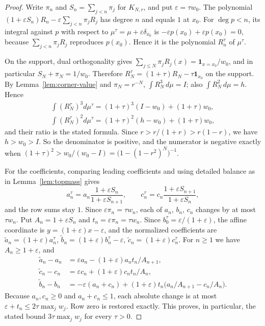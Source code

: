 \documentclass[twoside,10pt]{article}
\numberwithin{equation}{section}
\theoremstyle{slbody}
\theoremstyle{definition}
\theoremstyle{remark}
\begin{document}
\begin{proof}
Write $\pi_n$ and $S_n=\sum_{j<n}\pi_j$ for $K_{N,r}$, and put $\varepsilon=\tau w_0$. The polynomial $(1+\varepsilon S_n)R_n-\varepsilon\sum_{j<n}\pi_jR_j$ has degree $n$ and equals $1$ at $x_0$. For $\deg p<n$, its integral against $p$ with respect to $\mu^\tau=\mu+\varepsilon\delta_{x_0}$ is $-\varepsilon p(x_0)+\varepsilon p(x_0)=0$, because $\sum_{j<n}\pi_jR_j$ reproduces $p(x_0)$. Hence it is the polynomial $R_n^\tau$ of $\mu^\tau$.

On the support, dual orthogonality gives $\sum_{j\leq N}\pi_jR_j(x)=\boldsymbol1_{x=x_0}/w_0$, and in particular $S_N+\pi_N=1/w_0$. Therefore $R_N^\tau=(1+\tau)R_N-\tau\boldsymbol1_{x_0}$ on the support. By Lemma~\ref{lem:corner-value} and $\pi_N=r^{-N}$, $\int R_N^3\,d\mu=I$; also $\int R_N^2\,d\mu=h$. Hence
\begin{gather*}
\int(R_N^\tau)^3d\mu^\tau=(1+\tau)^3(I-w_0)+(1+\tau)w_0,\\
\int(R_N^\tau)^2d\mu^\tau=(1+\tau)^2(h-w_0)+(1+\tau)w_0,
\end{gather*}
and their ratio is the stated formula. Since $r>r/(1+r)>r(1-r)$, we have $h>w_0>I$. So the denominator is positive, and the numerator is negative exactly when $(1+\tau)^2>w_0/(w_0-I)=\bigl(1-(1-r^2)^N\bigr)^{-1}$.

For the coefficients, comparing leading coefficients and using detailed balance as in Lemma~\ref{lem:topmass} gives
\[
a_n^\tau=a_n\frac{1+\varepsilon S_n}{1+\varepsilon S_{n+1}},\qquad c_n^\tau=c_n\frac{1+\varepsilon S_{n+1}}{1+\varepsilon S_n},
\]
and the row sums stay $1$. Since $\varepsilon\pi_n=\tau w_n$, each of $a_n$, $b_n$, $c_n$ changes by at most $\tau w_n$. Put $A_n=1+\varepsilon S_n$ and $t_n=\varepsilon\pi_n=\tau w_n$. Since $b_0^\tau=\varepsilon/(1+\varepsilon)$, the affine coordinate is $y=(1+\varepsilon)x-\varepsilon$, and the normalized coefficients are $\widetilde a_n=(1+\varepsilon)a_n^\tau$, $\widetilde b_n=(1+\varepsilon)b_n^\tau-\varepsilon$, $\widetilde c_n=(1+\varepsilon)c_n^\tau$. For $n\geq1$ we have $A_n\geq1+\varepsilon$, and
\begin{align*}
\widetilde a_n-a_n&=\varepsilon a_n-(1+\varepsilon)a_nt_n/A_{n+1},\\
\widetilde c_n-c_n&=\varepsilon c_n+(1+\varepsilon)c_nt_n/A_n,\\
\widetilde b_n-b_n&=-\varepsilon(a_n+c_n)+(1+\varepsilon)t_n\bigl(a_n/A_{n+1}-c_n/A_n\bigr).
\end{align*}
Because $a_n,c_n\geq0$ and $a_n+c_n\leq1$, each absolute change is at most $\varepsilon+t_n\leq2\tau\max_jw_j$. Row zero is restored exactly. This proves, in particular, the stated bound $3\tau\max_jw_j$ for every $\tau>0$.
\end{proof}
\end{document}
